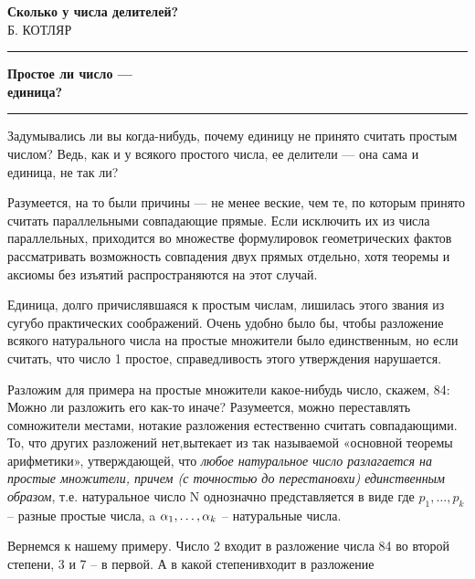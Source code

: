 


	
	\newpage
	\begin{center}
		{\bfseries \Huge Сколько у числа делителей?}\\[3 pt]
		{\large \textsc{Б. КОТЛЯР}}
	\end{center}
	\begin{multicols}{3}
		\rule{0pt}{3.4 em}
		\begin{flushleft}
			\hrule\smallskip
			{\bfseries \large Простое ли число ---\\ единица?}
			\smallskip\hrule\smallskip
		\end{flushleft}
		
		Задумывались ли вы когда-нибудь, почему единицу не принято считать простым числом? Ведь, как и у всякого простого числа, ее делители --- она сама и единица, не так ли?
		
		Разумеется, на то были причины --- не менее веские, чем те, по которым принято считать параллельными совпадающие прямые. Если исключить их из числа параллельных, приходится во множестве формулировок геометрических фактов рассматривать возможность совпадения двух прямых отдельно, хотя теоремы и аксиомы без изъятий распространяются на этот случай.
		
		Единица, долго причислявшаяся к простым числам, лишилась этого звания из сугубо практических соображений. Очень удобно было бы, чтобы разложение всякого натурального числа на простые множители было единственным, но если считать, что
		число 1 простое, справедливость этого
		утверждения нарушается.
		
		Разложим для примера на простые множители какое-нибудь число, скажем, 84:\\
		Можно ли разложить его как-то иначе? Разумеется, можно переставлять
		сомножители местами, нотакие разложения естественно считать совпадающими. То, что других разложений нет,вытекает из так называемой «основной теоремы арифметики», утверждающей, что \textit{любое натуральное число разлагается на простые множители, причем (с точностью до перестановхи) единственным образом}, т.е. натуральное число N однозначно представляется в виде
		где $p_1, \ldots, p_k$ -- разные простые числа, a $\alpha_1, \ldots, \alpha_k$ -- натуральные числа.
		
		Вернемся к нашему примеру. Число 2 входит в разложение числа 84 во второй степени, 3 и 7 -- в первой. А в какой степенивходит в разложение
		

\end{multicols}
